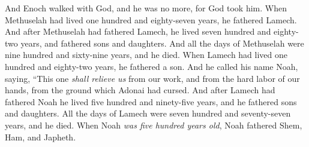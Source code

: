 \begin{biblechapter}
\verse And Enoch walked with God, and he was no more, for God took him.
\verse When Methuselah had lived one hundred and eighty-seven years, he fathered Lamech.
\verse And after Methuselah had fathered Lamech, he lived seven hundred and eighty-two years, and fathered sons and daughters.
\verse And all the days of Methuselah were nine hundred and sixty-nine years, and he died.
\verse When Lamech had lived one hundred and eighty-two years, he fathered a son.
\verse And he called his name Noah, saying, “This one \textit{shall relieve us} from our work, and from the hard labor of our hands, from the ground which Adonai had cursed.
\verse And after Lamech had fathered Noah he lived five hundred and ninety-five years, and he fathered sons and daughters.
\verse All the days of Lamech were seven hundred and seventy-seven years, and he died.
\verse When Noah \textit{was five hundred years old}, Noah fathered Shem, Ham, and Japheth.
\end{biblechapter}

